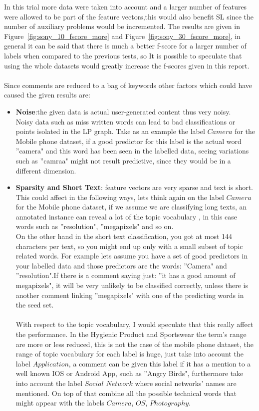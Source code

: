 \documentclass[4pt,a4paper,twocolumn]{article}
\begin{document}
In this trial more data were taken into account and a larger number of features were allowed to be part of the feature vectors,this would also benefit SL since the number of auxiliary problems would be incremented.
The results are given in Figure~\ref{fig:sony_10_fscore_more} and Figure~\ref{fig:sony_30_fscore_more}, in general it can be said that there is much a better f-score for a larger number of labels when compared to the previous tests, so It is possible to speculate that using the whole datasets would greatly increase the f-scores given in this report.\\
\\

Since comments are reduced to a bag of keywords other factors which could have caused the given results are:
\begin{itemize}
\item \textbf{Noise}:the given data is actual user-generated content thus very noisy.\\
Noisy data such as miss written words can lead to bad classifications or points isolated in the LP graph. Take as an example the label $Camera$ for the Mobile phone dataset, if a good predictor for this label is the actual word ''camera" and this word has been seen in the labelled data, seeing variations such as ''camraa" might not result predictive, since they would be in a different dimension.

\item \textbf{Sparsity and Short Text}: feature vectors are very sparse and text is short. This could affect in the following ways, lets think again on the label $Camera$ for the Mobile  phone dataset, if we assume we are classifying long texts, an annotated instance can reveal a lot of the topic vocabulary , in this case words such as ''resolution", ''megapixels" and so on.\\
On the other hand in the short text classification, you got at most 144 characters per text, so you might end up only with a small subset of topic related words.
For example lets assume you have a set of good predictors in your labelled data and those predictors are the words: ''Camera" and ''resolution".If there is a comment saying just: ''it has a good amount of megapixels", it will be very unlikely to be classified correctly, unless there is another comment linking ''megapixels" with one of the predicting words in the seed set.\\
\\
With respect to the topic vocabulary, I would speculate that this really affect the performance. In the Hygienic Product and  Sportswear the term's range are more or less reduced, this is not the case of the mobile phone dataset, the range of topic vocabulary for each label is huge, just take into account the label $Application$, a comment can be given this label if it has a mention to a well known IOS or Android App, such as ''Angry Birds", furthermore take into account the label $Social$ $Network$ where social networks' names are mentioned. On top of that combine all the possible technical words that might appear with the labels $Camera$, $OS$, $Photography$.

\end{itemize} 
\end{document}

